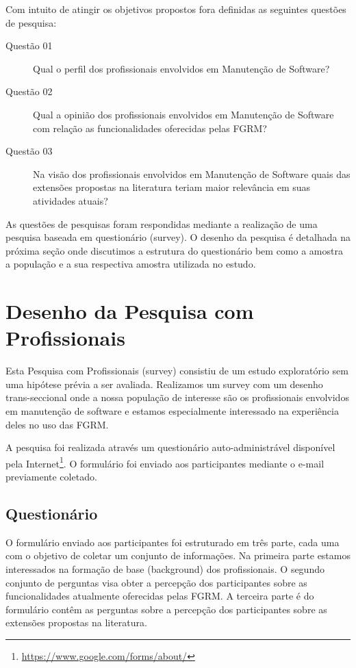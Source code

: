 Com intuito de atingir os objetivos propostos fora definidas as seguintes questões de pesquisa:
\begin{description}
	\item[Questão 01] Qual o perfil dos profissionais envolvidos em Manutenção de Software?
	\item[Questão 02] Qual a opinião dos profissionais envolvidos em Manutenção de Software com
		relação as funcionalidades oferecidas pelas FGRM?
	\item [Questão 03] Na visão  dos profissionais envolvidos em Manutenção de Software quais das
		extensões propostas na literatura teriam maior relevância em suas atividades atuais?
\end{description}

As questões de pesquisas foram respondidas mediante a realização de uma pesquisa baseada em
questionário (survey). O desenho da pesquisa é detalhada na próxima seção onde discutimos a estrutura
do questionário bem como a amostra a população e a sua respectiva amostra utilizada no estudo.

\section{Desenho da Pesquisa com Profissionais}
\label{sec:desenho_da_pesquisa_com_profissionais}

Esta Pesquisa com Profissionais (survey) consistiu de um estudo exploratório sem uma hipótese prévia
a ser avaliada. Realizamos um survey com um desenho trans-seccional\cite{kitchenham2002principles} onde a nossa população de
interesse são os profissionais envolvidos em manutenção de software e estamos especialmente
interessado na experiência deles no uso das FGRM. 

A pesquisa foi realizada através um questionário auto-administrável disponível pela
Internet\footnote{\url{https://www.google.com/forms/about/}}. O formulário foi enviado aos
participantes mediante o e-mail previamente coletado.


\subsection{Questionário}
\label{subsec:questionario}

O formulário enviado aos participantes foi estruturado em três parte, cada uma com o objetivo de
coletar um conjunto de informações. Na primeira parte estamos interessados na formação de base
(background) dos profissionais. O segundo conjunto de perguntas visa obter a percepção dos
participantes sobre as funcionalidades atualmente oferecidas pelas FGRM. A terceira parte é do
formulário contêm as perguntas sobre a percepção dos participantes sobre as extensões propostas na
literatura. 

